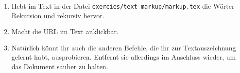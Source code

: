 \begin{enumerate}
  \item Hebt im Text in der Datei \texttt{exercies/text-markup/markup.tex} die Wörter \glqq{}Rekursion\grqq{} und \glqq{}rekursiv\grqq{} hervor.
  \item Macht die URL im Text anklickbar. 
  \item Natürlich könnt ihr auch die anderen Befehle, die ihr zur Textauszeichnung gelernt habt, ausprobieren. Entfernt sie allerdings im Anschluss wieder, um das Dokument sauber zu halten.
\end{enumerate}



